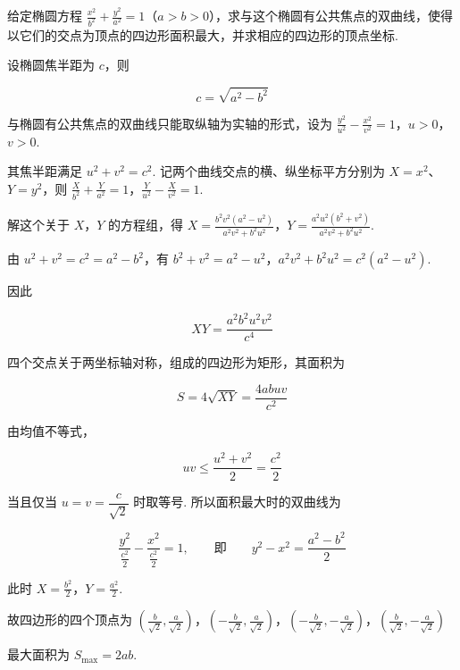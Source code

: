 \documentclass[UTF8,a4paper,oneside,11pt]{ctexbook}
\begin{document}
\begin{problem}
给定椭圆方程 \(\frac{x^2}{b^2} + \frac{y^2}{a^2} = 1\)（\(a > b > 0\)），求与这个椭圆有公共焦点的双曲线，使得以它们的交点为顶点的四边形面积最大，并求相应的四边形的顶点坐标.
\end{problem}

\begin{solution}
设椭圆焦半距为 \(c\)，则

\[c=\sqrt{a^2-b^2}\]

与椭圆有公共焦点的双曲线只能取纵轴为实轴的形式，设为 \(\frac{y^2}{u^2}-\frac{x^2}{v^2}=1\)，\(u>0\)，\(v>0\).

其焦半距满足 \(u^2+v^2=c^2\). 记两个曲线交点的横、纵坐标平方分别为 \(X=x^2\)、\(Y=y^2\)，则 \(\frac{X}{b^2}+\frac{Y}{a^2}=1\)，\(\frac{Y}{u^2}-\frac{X}{v^2}=1\).

解这个关于 \(X\)，\(Y\) 的方程组，得 \(X=\frac{b^2v^2(a^2-u^2)}{a^2v^2+b^2u^2}\)，\(Y=\frac{a^2u^2(b^2+v^2)}{a^2v^2+b^2u^2}\).

由 \(u^2+v^2=c^2=a^2-b^2\)，有 \(b^2+v^2=a^2-u^2\)，\(a^2v^2+b^2u^2=c^2(a^2-u^2)\).

因此

\[XY=\frac{a^2b^2u^2v^2}{c^4}\]

四个交点关于两坐标轴对称，组成的四边形为矩形，其面积为

\[S=4\sqrt{XY}=\frac{4abuv}{c^2}\]

由均值不等式，

\[uv\leqslant\frac{u^2+v^2}{2}=\frac{c^2}{2}\]

当且仅当 \(u=v=\dfrac{c}{\sqrt2}\) 时取等号. 所以面积最大时的双曲线为

\[\frac{y^2}{\frac{c^2}{2}}-\frac{x^2}{\frac{c^2}{2}}=1,\qquad\text{即}\qquad y^2-x^2=\frac{a^2-b^2}{2}\]

此时 \(X=\frac{b^2}{2}\)，\(Y=\frac{a^2}{2}\).

故四边形的四个顶点为 \(\left(\frac{b}{\sqrt2},\frac{a}{\sqrt2}\right)\)，\(\left(-\frac{b}{\sqrt2},\frac{a}{\sqrt2}\right)\)，\(\left(-\frac{b}{\sqrt2},-\frac{a}{\sqrt2}\right)\)，\(\left(\frac{b}{\sqrt2},-\frac{a}{\sqrt2}\right)\)

最大面积为 \(S_{\max}=2ab\).
\end{solution}

\end{document}
